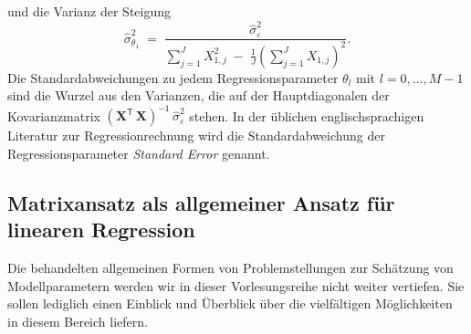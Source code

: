und die Varianz der Steigung
\begin{equation}
\hat \sigma^2_{\theta_1} \; = \; 
\frac{\hat \sigma^2_\varepsilon}{\sum\limits_{j=1}^J X_{1,j}^2 \; - \; 
	\frac{1}{J}\left(\sum\limits_{j=1}^J X_{1,j}\right)^2} .
\end{equation}
Die Standardabweichungen zu jedem Regressionsparameter $\theta_l$ mit $l = 0,\dots,M-1$ sind
die Wurzel aus den Varianzen, die auf der Hauptdiagonalen der Kovarianzmatrix 
$\left( \mathbf{X}^\mathsf{T}  \, \mathbf{X} \right)^{-1} \, \hat \sigma_{\varepsilon}^2$
stehen. In der üblichen englischsprachigen Literatur zur Regressionrechnung wird
die Standardabweichung der Regressionsparameter \textsl{Standard Error} genannt.




\subsection{Matrixansatz als allgemeiner Ansatz für linearen Regression}
Die behandelten allgemeinen Formen von Problemstellungen zur Schätzung von Modellparametern
werden wir in dieser Vorlesungsreihe nicht weiter vertiefen. Sie sollen lediglich einen Einblick und Überblick über die vielfältigen Möglichkeiten in diesem Bereich liefern.

